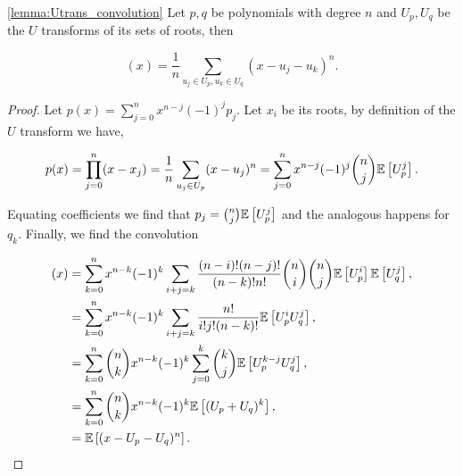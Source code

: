 


\begin{lemma} \ref{lemma:Utrans_convolution}
    Let $p,q$ be polynomials with degree $n$ and $U_p,U_q$ be the $U$ transforms of its sets of roots, then

    \begin{equation*}
        [p \boxplus_n q](x) = \frac1n \sum_{u_j \in U_p, u_k \in U_q} (x - u_j -u_k)^n.
    \end{equation*}
\end{lemma}

\begin{proof}
    Let $p(x) = \sum_{j=0}^n x^{n-j}(-1)^j p_j$. Let $x_i$ be its roots, by definition of the $U$ transform we have,

    \begin{equation*}
        p(x) = \prod_{j=0}^n (x - x_j) = \frac1n \sum_{u_j \in U_p} (x-u_j)^n = \sum_{j=0}^n x^{n-j} (-1)^j \binom n j \mathbb E \left[ U_p^j \right].
    \end{equation*}

    Equating coefficients we find that $p_j = \binom nj\mathbb E \left[ U_p^j \right]$ and the analogous happens for $q_k$. Finally, we find the convolution

    \begin{align*}
        [p\boxplus_n q](x) &= \sum_{k=0}^n x^{n-k}(-1)^k \sum_{i+j=k} \frac{(n-i)!(n-j)!}{(n-k)!n!} \binom{n}{i}\binom{n}{j} \E{U_p^i} \E{U_q^j},\\
        &= \sum_{k=0}^n x^{n-k}(-1)^k \sum_{i+j=k} \frac{n!}{i!j!(n-k)!} \E{U_p^i U_q^j}, \\
        &= \sum_{k=0}^n \binom nk x^{n-k}(-1)^k \sum_{j=0}^k \binom{k}{j}\E{U_p^{k-j} U_q^j}, \\
        &= \sum_{k=0}^n \binom nk x^{n-k}(-1)^k \E{(U_p + U_q)^k},\\
        &= \E{ (x - U_p - U_q)^n }. 
    \end{align*}
\end{proof}

